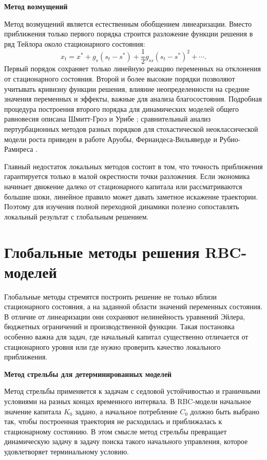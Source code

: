 \medskip
\noindent\textbf{Метод возмущений}
\par\smallskip

Метод возмущений является естественным обобщением линеаризации. Вместо
приближения только первого порядка строится разложение функции решения в ряд
Тейлора около стационарного состояния:
\[
    x_t
    =
    x^*
    +
    g_s(s_t-s^*)
    +
    \frac{1}{2}g_{ss}(s_t-s^*)^2
    +
    \cdots .
\]
Первый порядок сохраняет только линейную реакцию переменных на отклонения от
стационарного состояния. Второй и более высокие порядки позволяют учитывать
кривизну функции решения, влияние неопределенности на средние значения
переменных и эффекты, важные для анализа благосостояния. Подробная процедура
построения второго порядка для динамических моделей общего равновесия описана
Шмитт-Гроэ и Урибе \cite{schmittgrohe2004solving}; сравнительный анализ
пертурбационных методов разных порядков для стохастической неоклассической
модели роста приведен в работе Аруобы, Фернандеса-Вильяверде и
Рубио-Рамиреса \cite{aruoba2006comparing}.

Главный недостаток локальных методов состоит в том, что точность приближения
гарантируется только в малой окрестности точки разложения. Если экономика
начинает движение далеко от стационарного капитала или рассматриваются большие
шоки, линейное правило может давать заметное искажение траектории. Поэтому для
изучения полной переходной динамики полезно сопоставлять локальный результат с
глобальным решением.

\section{Глобальные методы решения RBC-моделей}

Глобальные методы стремятся построить решение не только вблизи стационарного
состояния, а на заданной области значений переменных состояния. В отличие от
линеаризации они сохраняют нелинейность уравнений Эйлера, бюджетных ограничений
и производственной функции. Такая постановка особенно важна для задач, где
начальный капитал существенно отличается от стационарного уровня или где нужно
проверить качество локального приближения.

\medskip
\noindent\textbf{Метод стрельбы для детерминированных моделей}
\par\smallskip

Метод стрельбы применяется к задачам с седловой устойчивостью и граничными
условиями на разных концах временного интервала. В RBC-модели начальное
значение капитала $K_0$ задано, а начальное потребление $C_0$ должно быть
выбрано так, чтобы построенная траектория не расходилась и приближалась к
стационарному состоянию. В этом смысле метод стрельбы превращает динамическую
задачу в задачу поиска такого начального управления, которое удовлетворяет
терминальному условию.

